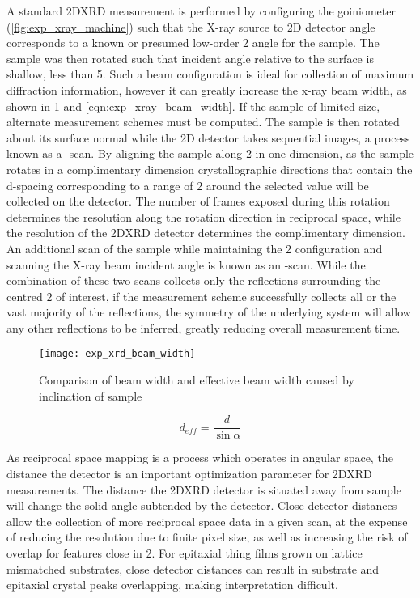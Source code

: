 A standard 2DXRD measurement is performed by configuring the goiniometer (\cref{fig:exp_xray_machine}) such that the X-ray source to 2D detector angle corresponds to a known or presumed low-order 2\straighttheta{} angle for the sample. The sample was then rotated such that incident angle relative to the surface is shallow, less than 5\degree{}. Such a beam configuration is ideal for collection of maximum diffraction information, however it can greatly increase the x-ray beam width, as shown in \cref{fig:exp_xray_beam_width} and \cref{eqn:exp_xray_beam_width}. If the sample of limited size, alternate measurement schemes must be computed. The sample is then rotated about its surface normal while the 2D detector takes sequential images, a process known as a \textphi{}-scan. By aligning the sample along 2\straighttheta{} in one dimension, as the sample rotates in a complimentary dimension crystallographic directions that contain the d-spacing corresponding to a range of 2\straighttheta{} around the selected value will be collected on the detector. The number of frames exposed during this rotation determines the resolution along the rotation direction in reciprocal space, while the resolution of the 2DXRD detector determines the complimentary dimension. An additional scan of the sample while maintaining the 2\straighttheta{} configuration and scanning the X-ray beam incident angle is known as an \textomega{}-scan. While the combination of these two scans collects only the reflections surrounding the centred 2\straighttheta{} of interest, if the measurement scheme successfully collects all or the vast majority of the reflections, the symmetry of the underlying system will allow any other reflections to be inferred, greatly reducing overall measurement time.
\begin{figure}
    \centering
    \texttt{[image: exp\_xrd\_beam\_width]}
    \caption[X-Ray Beam Width]{\label{fig:exp_xray_beam_width}Comparison of beam width and effective beam width caused by inclination of sample}
\end{figure}
\begin{equation}
d_{eff} = \frac{d}{\sin{\alpha}} \label{eqn:exp_xray_beam_width}
\end{equation}

As reciprocal space mapping is a process which operates in angular space, the distance the detector is an important optimization parameter for 2DXRD measurements. The distance the 2DXRD detector is situated away from sample will change the solid angle subtended by the detector. Close detector distances allow the collection of more reciprocal space data in a given scan, at the expense of reducing the resolution due to finite pixel size, as well as increasing the risk of overlap for features close in 2\straighttheta{}. For epitaxial thing films grown on lattice mismatched substrates, close detector distances can result in substrate and epitaxial crystal peaks overlapping, making interpretation difficult.

